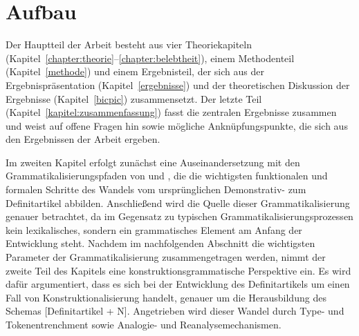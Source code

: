 



\section{Aufbau} 

Der Hauptteil der Arbeit besteht aus vier Theoriekapiteln  (Kapitel~\ref{chapter:theorie}--\ref{chapter:belebtheit}), einem Methodenteil (Kapitel~\ref{methode}) und einem Ergebnisteil, der sich aus der Ergebnispräsentation (Kapitel~\ref{ergebnisse}) und der theoretischen Diskussion der Ergebnisse (Kapitel~\ref{bicpic}) zusammensetzt. Der letzte Teil (Kapitel~\ref{kapitel:zusammenfassung}) fasst die zentralen Ergebnisse zusammen und weist auf offene Fragen hin sowie mögliche Anknüpfungspunkte, die sich aus den Ergebnissen der Arbeit ergeben. 

Im zweiten Kapitel erfolgt zunächst eine Auseinandersetzung mit den Grammatikalisierungspfaden von \textcite{Greenberg1978} und \textcite{Lehmann2015}, die die wichtigsten funktionalen und formalen Schritte des Wandels vom ursprünglichen Demonstrativ- zum Definitartikel abbilden. Anschließend wird die Quelle dieser Grammatikalisierung genauer betrachtet, da im Gegensatz zu typischen Grammatikalisierungsprozessen kein lexikalisches, sondern ein grammatisches Element am Anfang der Entwicklung steht. Nachdem im nachfolgenden Abschnitt die wichtigsten Parameter der Grammatikalisierung zusammengetragen werden, nimmt der zweite Teil des Kapitels eine konstruktionsgrammatische Perspektive ein. Es wird dafür argumentiert, dass es sich bei der Entwicklung des Definitartikels um einen Fall von Konstruktionalisierung handelt, genauer um die Herausbildung des Schemas [Definitartikel + N]. Angetrieben wird dieser Wandel durch Type- und Tokenentrenchment sowie Analogie- und Reanalysemechanismen. 

